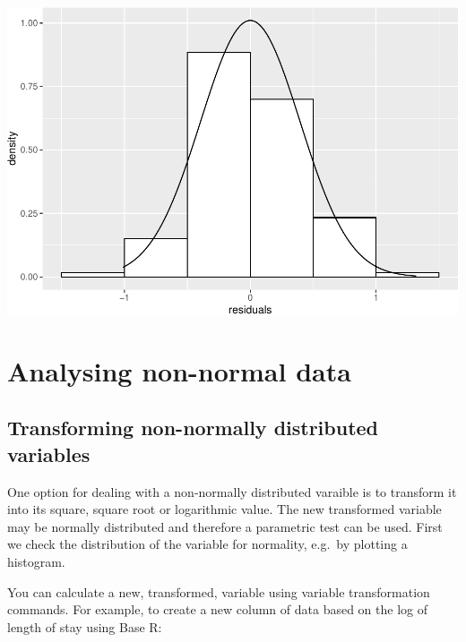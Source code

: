 \documentclass[
]{memoir}
\newenvironment{Shaded}{\begin{snugshade}}{\end{snugshade}}
\newcommand{\CommentTok}[1]{\textcolor[rgb]{0.56,0.35,0.01}{\textit{#1}}}
\newcommand{\DecValTok}[1]{\textcolor[rgb]{0.00,0.00,0.81}{#1}}
\newcommand{\FunctionTok}[1]{\textcolor[rgb]{0.00,0.00,0.00}{#1}}
\newcommand{\NormalTok}[1]{#1}
\newcommand{\OtherTok}[1]{\textcolor[rgb]{0.56,0.35,0.01}{#1}}
\newcommand{\SpecialCharTok}[1]{\textcolor[rgb]{0.00,0.00,0.00}{#1}}
\newcommand{\StringTok}[1]{\textcolor[rgb]{0.31,0.60,0.02}{#1}}
\begin{document}
\includegraphics{phcm9795-R-notes_files/figure-latex/unnamed-chunk-103-2.pdf}

\hypertarget{analysing-non-normal-data}{%
\chapter{Analysing non-normal data}\label{analysing-non-normal-data}}

\hypertarget{transforming-non-normally-distributed-variables}{%
\section{Transforming non-normally distributed variables}\label{transforming-non-normally-distributed-variables}}

One option for dealing with a non-normally distributed varaible is to transform it into its square, square root or logarithmic value. The new transformed variable may be normally distributed and therefore a parametric test can be used. First we check the distribution of the variable for normality, e.g.~by plotting a histogram.

You can calculate a new, transformed, variable using variable transformation commands. For example, to create a new column of data based on the log of length of stay using Base R:

\begin{Shaded}
\end{Shaded}
\end{document}
